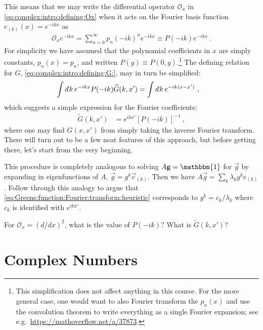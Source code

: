 This means that we may write the differential operator $\mathcal O_x$ in \eqref{eq:complex:intro:defining:Ox} when it acts on the Fourier basis function $e_{(k)}(x) = e^{-ikx}$ as
\begin{align}
  \mathcal O_x e^{-ikx} = \sum_{n=0}^{\infty}
  p_n \left(-ik\right)^n e^{-ikx}
  \equiv P(-ik) e^{-ikx}  \ .
\end{align}
For simplicity we have assumed that the polynomial coefficients in $x$ are simply constants, $p_n(x) = p_n$, and written $P(y) \equiv P(0,y)$.\footnote{This simplification does not affect anything in this course. For the more general case, one would want to also Fourier transform the $p_n(x)$ and use the convolution theorem to write everything as a single Fourier expansion; see e.g.~\url{https://mathoverflow.net/a/37873}.}
The defining relation for $G$,
\eqref{eq:complex:intro:defining:G:}, may in turn be simplified:
\begin{align}
  \int \dbar k \, e^{-ikx} P(-ik) \tilde G(k,x') &= \int \dbar k \, e^{-ik(x-x')} \ ,
\end{align}
which suggests a simple expression for the Fourier coefficients:
\begin{align}
  \tilde G(k,x') &= e^{ikx'} \left[P(-ik)\right]^{-1} \ ,
  \label{eq:Greens:function:Fourier:transform:heuristic}
\end{align}
where one may find $G(x,x')$ from simply taking the inverse Fourier transform. There will turn out to be a few neat features of this approach, but before getting there, let's start from the very beginning.

\begin{exercise}
This procedure is completely analogous to solving $A \vec{g} = \mathbbm{1}$ for $\vec{g}$ by expanding in eigenfunctions of $A$, $\vec g = g^k \vec{e}_{(k)}$. Then we have $A\vec{g} = \sum_k \lambda_k g^k e_{(k)}$. Follow through this analogy to argue that \eqref{eq:Greens:function:Fourier:transform:heuristic} corresponds to $g^k = c_k/\lambda_k$ where $c_k$ is identified with $e^{ikx'}$.
\end{exercise}

\begin{exercise}
For $\mathcal O_x = (d/dx)^2$, what is the value of $P(-ik)$? What is $\tilde G(k,x')$?
\end{exercise}

\section{Complex Numbers}



